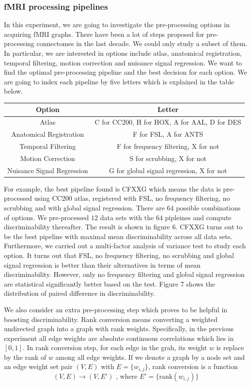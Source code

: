 \documentclass{article}
\begin{document}
\subsubsection{fMRI processing pipelines}
In this experiment, we are going to investigate the pre-processing options in acquiring fMRI graphs. There have been a lot of steps proposed for pre-processing connectomes in the last decade. We could only study a subset of them. In particular, we are interested in options include atlas, anatomical registration, temporal filtering, motion correction and nuisance signal regression. We want to find the optimal pre-processing pipeline and the best decision for each option. We are going to index each pipeline by five letters which is explained in the table below.   
\begin{center}
	\begin{tabular}{ |c|c| } 
		\hline
		Option & Letter  \\ \hline
		Atlas & C for CC200, H for HOX, A for AAL, D for DES  \\ \hline
		Anatomical Registration & F for FSL, A for ANTS \\ \hline
		Temporal Filtering & F for frequency filtering, X for not  \\ \hline
		Motion Correction & S for scrubbing, X for not  \\ \hline
		Nuisance Signal Regression & G for global signal regression, X for not  \\ \hline
	\end{tabular}
\end{center}
For example, the best pipeline found is CFXXG which means the data is pre-processed using CC200 atlas, registered with FSL, no frequency filtering, no scrubbing and with global signal regression. There are $64$ possible combinations of options. We pre-processed $12$ data sets with the $64$ pipleines and compute discriminability thereafter. The result is shown in figure 6. CFXXG turns out to be the best pipeline with maximal mean discriminability across all data sets. Furthermore, we carried out a multi-factor analysis of variance test to study each option. It turns out that FSL, no frequency filtering, no scrubbing and global signal regression is better than their alternatives in terms of mean discriminability. However, only no frequency filtering and global signal regression are statistical significantly better based on the test. Figure 7 shows the distribution of paired difference in discriminability.

We also consider an extra  pre-processing step which proves to be helpful in boosting discriminability. Rank conversion means converting a weighted undirected graph into a graph with rank weights. Specifically, in the previous experiment all edge weights are absolute continuous correlations which lies in $[0,1]$. In rank conversion step, for each edge in the grah, its weight $w$ is replace by the rank of $w$ among all edge weights. If we denote a graph by a node set and an edge weight set pair $(V,E)$ with $E=\{w_{i,j}\}$, rank conversion is a function
\[(V,E) \rightarrow (V,E') \text{ , where } E'= \{\text{rank}(w_{i,j})\} \]
\end{document}
